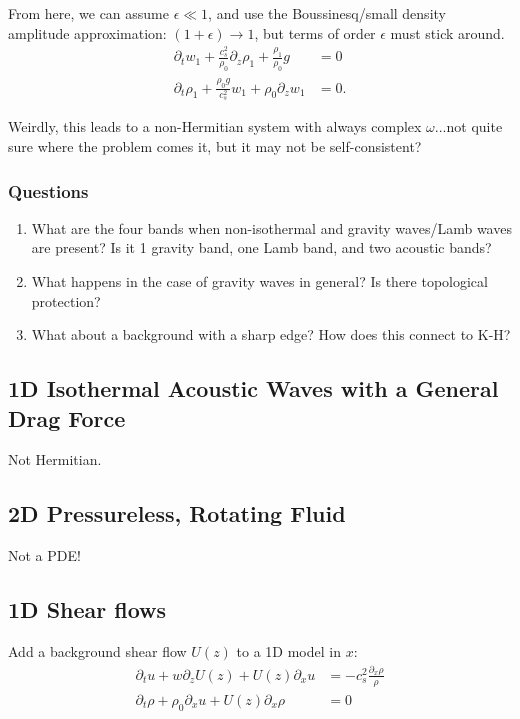 \documentclass[11pt]{article}
\begin{document}
From here, we can assume $\epsilon \ll 1$, and use the Boussinesq/small density amplitude approximation: $(1+\epsilon) \to 1$, but terms of order $\epsilon$ must stick around.
\begin{align}
  \partial_t w_1 +\frac{c_s^2}{\rho_0} \partial_z \rho_1 + \frac{\rho_1}{\rho_0} g &= 0 \label{eq:1d_final_mom}\\
  \partial_t \rho_1 + \frac{\rho_0 g}{c_s^2} w_1 + \rho_0 \partial_z w_1  &= 0.\label{eq:1d_final_density}
\end{align}

Weirdly, this leads to a non-Hermitian system with always complex $\omega$...not quite sure where the problem comes it, but it may not be self-consistent?


\subsubsection{Questions}
\label{sec:acoustic_questions}

\begin{enumerate}
\item What are the four bands when non-isothermal and gravity waves/Lamb waves are present? Is it 1 gravity band, one Lamb band, and two acoustic bands?
\item What happens in the case of gravity waves in general? Is there topological protection?
\item What about a background with a sharp edge? How does this connect to K-H?
\end{enumerate}

\subsection{1D Isothermal Acoustic Waves with a General Drag Force }
\label{sec:1D_acoustic_drag}

Not Hermitian.

\subsection{2D Pressureless, Rotating Fluid }
\label{sec:1d_pressureless}

Not a PDE!

\subsection{1D Shear flows}
\label{sec:shear}

Add a background shear flow $U(z)$ to a 1D model in $x$:
\begin{align}
  \label{eq:shear}
  \partial_t u + w \partial_z U(z) + U(z) \partial_x u &= -c_s^2\frac{\partial_x \rho}{\rho}\\
  \partial_t \rho + \rho_0 \partial_x u + U(z) \partial_x \rho &= 0
\end{align}
\end{document}
